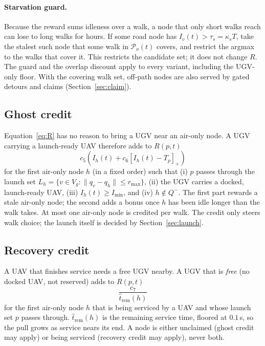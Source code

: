 \documentclass[11pt]{article}
\newcommand{\pos}[1]{[#1]_+}
\theoremstyle{definition}
\theoremstyle{plain}
\begin{document}
\paragraph{Starvation guard.} Because the reward sums idleness over a walk,
a node that only short walks reach can lose to long walks for hours. If
some road node has $I_v(t) > \tau_s = \kappa_s T$, take the stalest such
node that some walk in $\mathcal{P}_o(t)$ covers, and restrict the argmax to
the walks that cover it. This restricts the candidate set; it does not
change $R$. The guard and the overlap discount apply to every variant,
including the UGV-only floor. With the covering walk set, off-path nodes
are also served by gated detours and claims (Section~\ref{sec:claim}).

\subsection{Ghost credit}
\label{sec:ghost}

Equation~\eqref{eq:R} has no reason to bring a UGV near an air-only node.
A UGV carrying a launch-ready UAV therefore adds to $R(p, t)$
\begin{equation}
c_5 \left( I_h(t) + c_6 \pos{I_h(t) - T_p} \right)
\label{eq:ghost}
\end{equation}
for the first air-only node $h$ (in a fixed order) such that
(i) $p$ passes through the launch set $L_h = \{ v \in V_g : \|q_v - q_h\|
\leq r_{\max} \}$,
(ii) the UGV carries a docked, launch-ready UAV,
(iii) $I_h(t) \geq I_{\min}$, and
(iv) $h \notin Q^-$.
The first part rewards a stale air-only node; the second adds a bonus once
$h$ has been idle longer than the walk takes. At most one air-only node is
credited per walk. The credit only steers walk choice; the launch itself is
decided by Section~\ref{sec:launch}.

\subsection{Recovery credit}
\label{sec:rec}

A UAV that finishes service needs a free UGV nearby. A UGV that is
\emph{free} (no docked UAV, not reserved) adds to $R(p, t)$
\begin{equation}
\frac{c_7}{\hat t_{\mathrm{rem}}(h)}
\end{equation}
for the first air-only node $h$ that is being serviced by a UAV and whose
launch set $p$ passes through. $\hat t_{\mathrm{rem}}(h)$ is the remaining
service time, floored at $0.1$\,s, so the pull grows as service nears its
end. A node is either unclaimed (ghost credit may apply) or being serviced
(recovery credit may apply), never both.
\end{document}
